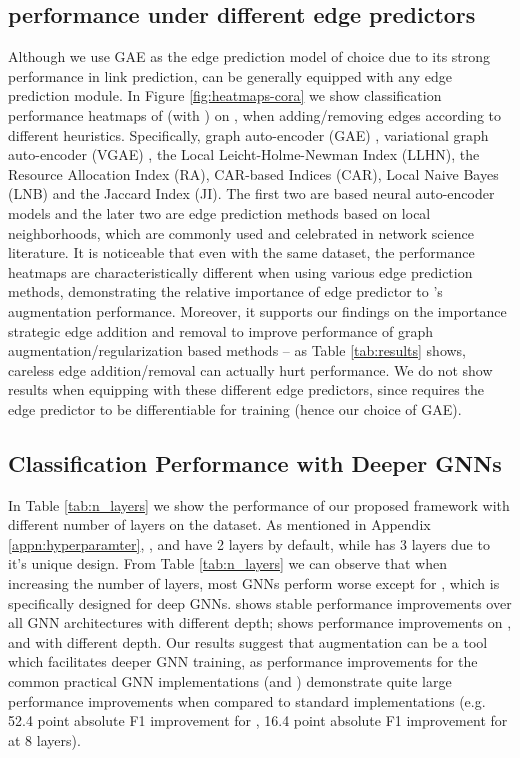 \documentclass[letterpaper]{article} \usepackage{aaai21}  \usepackage{times}  \usepackage{helvet} \usepackage{courier}  \usepackage[hyphens]{url}  \usepackage{graphicx} \urlstyle{rm} \def\UrlFont{\rm}  \usepackage{natbib}  \usepackage{caption} \frenchspacing  \setlength{\pdfpagewidth}{8.5in}  \setlength{\pdfpageheight}{11in}
\begin{document}
\subsection{\methodtwo performance under different edge predictors} 
Although we use GAE as the edge prediction model of choice due to its strong performance in link prediction, \methodtwo can be generally equipped with any edge prediction module. 
In Figure \ref{fig:heatmaps-cora} we show classification performance heatmaps of \methodtwo (with \gcn) on \cora, when adding/removing edges according to different heuristics. Specifically, graph auto-encoder (GAE) \cite{kipf2016variational}, variational graph auto-encoder (VGAE) \cite{kipf2016variational}, the Local Leicht-Holme-Newman Index (LLHN), the Resource Allocation Index (RA), CAR-based Indices (CAR), Local Naive Bayes (LNB) and the Jaccard Index (JI). The first two are \gcn based neural auto-encoder models and the later two are edge prediction methods based on local neighborhoods, which are commonly used and celebrated in network science literature. It is noticeable that even with the same dataset, the performance heatmaps are characteristically different  when using various edge prediction methods, demonstrating the relative importance of edge predictor to \methodtwo's augmentation performance.  Moreover, it supports our findings on the importance strategic edge addition and removal to improve performance of graph augmentation/regularization based methods -- as Table \ref{tab:results} shows, careless edge addition/removal can actually hurt performance.  We do not show results when equipping \method with these different edge predictors, since \method requires the edge predictor to be differentiable for training (hence our choice of GAE).


\subsection{Classification Performance with Deeper GNNs}
In Table \ref{tab:n_layers} we show the performance of our proposed \methodshared framework with different number of layers on the \cora dataset. As mentioned in Appendix \ref{appn:hyperparamter}, \gcn, \gsage and \gat have 2 layers by default, while \jknet has 3 layers due to it's unique design. From Table \ref{tab:n_layers} we can observe that when increasing the number of layers, most GNNs perform worse except for \jknet, which is specifically designed for deep GNNs. \methodtwo shows stable performance improvements over all GNN architectures with different depth; \method shows performance improvements on \gcn, \gsage and \jknet with different depth.  Our results suggest that augmentation can be a tool which facilitates deeper GNN training, as performance improvements for the common practical GNN implementations (\gcn and \gsage) demonstrate quite large performance improvements when compared to standard implementations (e.g. 52.4 point absolute F1 improvement for \gcn, 16.4 point absolute F1 improvement for \gsage at 8 layers).
\end{document}
